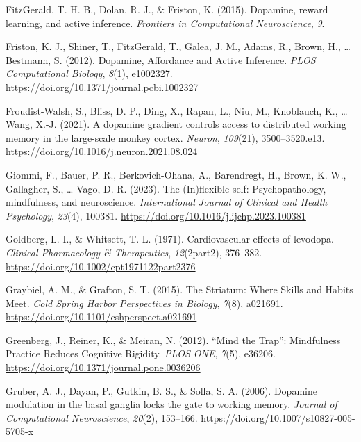 \documentclass[
  man]{apa6}
\newlength{\cslhangindent}
\newlength{\cslentryspacingunit} %
\newenvironment{CSLReferences}[2] %
 {%
  \setlength{\parindent}{0pt}
  \ifodd #1
  \let\oldpar\par
  \def\par{\hangindent=\cslhangindent\oldpar}
  \fi
  \setlength{\parskip}{#2\cslentryspacingunit}
 }%
 {}
\begin{document}
\begin{CSLReferences}{1}{0}
\leavevmode{}%
FitzGerald, T. H. B., Dolan, R. J., \& Friston, K. (2015). Dopamine, reward learning, and active inference. \emph{Frontiers in Computational Neuroscience}, \emph{9}.

\leavevmode{}%
Friston, K. J., Shiner, T., FitzGerald, T., Galea, J. M., Adams, R., Brown, H., \ldots{} Bestmann, S. (2012). Dopamine, {Affordance} and {Active Inference}. \emph{PLOS Computational Biology}, \emph{8}(1), e1002327. \url{https://doi.org/10.1371/journal.pcbi.1002327}

\leavevmode{}%
Froudist-Walsh, S., Bliss, D. P., Ding, X., Rapan, L., Niu, M., Knoblauch, K., \ldots{} Wang, X.-J. (2021). A dopamine gradient controls access to distributed working memory in the large-scale monkey cortex. \emph{Neuron}, \emph{109}(21), 3500--3520.e13. \url{https://doi.org/10.1016/j.neuron.2021.08.024}

\leavevmode{}%
Giommi, F., Bauer, P. R., Berkovich-Ohana, A., Barendregt, H., Brown, K. W., Gallagher, S., \ldots{} Vago, D. R. (2023). The ({In})flexible self: {Psychopathology}, mindfulness, and neuroscience. \emph{International Journal of Clinical and Health Psychology}, \emph{23}(4), 100381. \url{https://doi.org/10.1016/j.ijchp.2023.100381}

\leavevmode{}%
Goldberg, L. I., \& Whitsett, T. L. (1971). Cardiovascular effects of levodopa. \emph{Clinical Pharmacology \& Therapeutics}, \emph{12}(2part2), 376--382. \url{https://doi.org/10.1002/cpt1971122part2376}

\leavevmode{}%
Graybiel, A. M., \& Grafton, S. T. (2015). The {Striatum}: {Where Skills} and {Habits Meet}. \emph{Cold Spring Harbor Perspectives in Biology}, \emph{7}(8), a021691. \url{https://doi.org/10.1101/cshperspect.a021691}

\leavevmode{}%
Greenberg, J., Reiner, K., \& Meiran, N. (2012). {``{Mind} the {Trap}''}: {Mindfulness Practice Reduces Cognitive Rigidity}. \emph{PLOS ONE}, \emph{7}(5), e36206. \url{https://doi.org/10.1371/journal.pone.0036206}

\leavevmode{}%
Gruber, A. J., Dayan, P., Gutkin, B. S., \& Solla, S. A. (2006). Dopamine modulation in the basal ganglia locks the gate to working memory. \emph{Journal of Computational Neuroscience}, \emph{20}(2), 153--166. \url{https://doi.org/10.1007/s10827-005-5705-x}


\end{CSLReferences}
\end{document}
